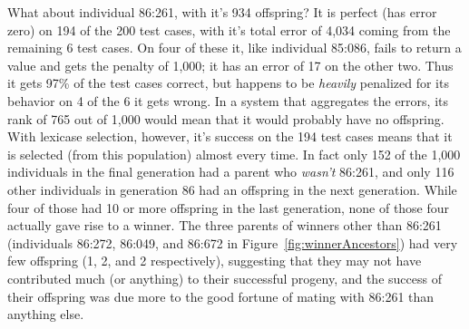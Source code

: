 What about individual 86:261, with it's 934 offspring? It is perfect (has error zero) on 194 of the 200
test cases, with it's total error of 4,034 coming from the remaining 6 test cases. On four of these it,
like individual 85:086, fails to return a value and gets the penalty of 1,000; it has an error of 17 on
the other two. Thus it gets 97\% of the test cases correct, but happens to be \emph{heavily} penalized
for its behavior on 4 of the 6 it gets wrong. In a system that aggregates the errors, its rank of 765
out of 1,000 would mean that it would probably have no offspring. With lexicase selection, however,
it's success on the 194 test cases means that it is selected (from this population) almost every time.
In fact only 152 of the 1,000 individuals in the final generation had a parent who \emph{wasn't}
86:261, and only 116 other individuals in generation 86 had an offspring in the next generation. While
four of those had 10 or more offspring in the last generation, none of those four actually
gave rise to a winner. The three parents of winners other than 86:261 (individuals 86:272, 86:049, 
and 86:672 in Figure~\ref{fig:winnerAncestors}) had very few offspring (1, 2, and 2 respectively),
suggesting that they may not have contributed much (or anything) to their successful progeny, and 
the success of their offspring was due more to the good fortune of mating with 86:261 than anything else.

